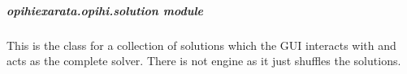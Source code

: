 \documentclass[letterpaper,11pt,english]{sphinxmanual}
\begin{document}
\sphinxstepscope


\subparagraph{opihiexarata.opihi.solution module}
\label{\detokenize{code/opihiexarata.opihi.solution:module-opihiexarata.opihi.solution}}\label{\detokenize{code/opihiexarata.opihi.solution:opihiexarata-opihi-solution-module}}\label{\detokenize{code/opihiexarata.opihi.solution::doc}}
\sphinxAtStartPar
This is the class for a collection of solutions which the GUI interacts
with and acts as the complete solver. There is not engine as it just shuffles
the solutions.
\end{document}
